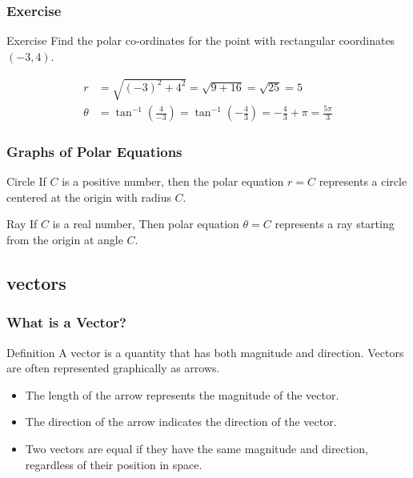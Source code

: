 \documentclass{beamer}
\begin{document}
\begin{frame}
    \frametitle{Exercise}
    \begin{exampleblock}{Exercise}
        Find the polar co-ordinates for the point with rectangular coordinates \((-3, 4)\).
    \end{exampleblock}
    \begin{solutionblock}
        \begin{align*}
            r &= \sqrt{(-3)^2 + 4^2} = \sqrt{9 + 16} = \sqrt{25} = 5 \\
            \theta &= \tan^{-1}\left(\frac{4}{-3}\right) = \tan^{-1}\left(-\frac{4}{3}\right) = -\frac{4}{3} + \pi = \frac{5\pi}{3}
        \end{align*}
    \end{solutionblock}
\end{frame}

\begin{frame}
\frametitle{Graphs of Polar Equations}
\begin{block}{Circle}
    If \(C\) is a positive number, then the polar equation \(r = C\) represents a circle centered at the origin with radius \(C\).
\end{block}
\begin{block}{Ray}
   If \(C\) is a real number, Then polar equation \(\theta = C\) represents a ray starting from the origin at angle \(C\).
\end{block}
\end{frame}

\subsection{vectors}
\begin{frame}
    \frametitle{What is a Vector?}
    \begin{block}{Definition}
        A vector is a quantity that has both magnitude and direction. Vectors are often represented graphically as arrows.
        \begin{itemize}
            \item The length of the arrow represents the magnitude of the vector.
            \item The direction of the arrow indicates the direction of the vector.
            \item Two vectors are equal if they have the same magnitude and direction, regardless of their position in space.
        \end{itemize}
    \end{block}
\end{frame}
\end{document}
